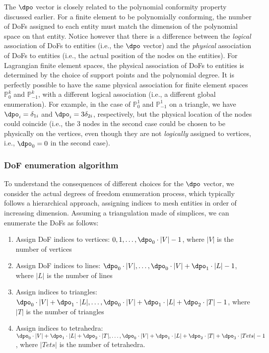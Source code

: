 \begin{remark}
  The $\dpo$ vector is closely related to the polynomial conformity property discussed earlier. For a finite element to be polynomially conforming, the number of DoFs assigned to each entity must match the dimension of the polynomial space on that entity. Notice however that there is a difference between the \emph{logical} association of DoFs to entities (i.e., the $\dpo$ vector) and the \emph{physical} association of DoFs to entities (i.e., the actual position of the nodes on the entities). For Lagrangian finite element spaces, the physical association of DoFs to entities is determined by the choice of support points and the polynomial degree. It is perfectly possible to have the same physical association for finite element spaces $\mathbb{P}^k_{0}$ and $\mathbb{P}^k_{-1}$, with a different logical association (i.e., a different global enumeration). For example, in the case of $\mathbb{P}^1_{0}$ and $\mathbb{P}^1_{-1}$ on a triangle, we have $\dpo_i = \delta_{1i}$ and $\dpo_i = 3\delta_{2i}$, respectively, but the physical location of the nodes could coincide (i.e., the $3$ nodes in the second case could be chosen to be physically on the vertices, even though they are not \emph{logically} assigned to vertices, i.e., $\dpo_0 = 0$ in the second case).
\end{remark}

\subsubsection{DoF enumeration algorithm}

To understand the consequences of different choices for the $\dpo$ vector, we consider the actual degrees of freedom enumeration process, which typically follows a hierarchical approach, assigning indices to mesh entities in order of increasing dimension. Assuming a triangulation made of simplices, we can enumerate the DoFs as follows:

\begin{enumerate}
  \item Assign DoF indices to vertices: $0, 1, \ldots, \dpo_0 \cdot |V| - 1$, where $|V|$ is the number of vertices
  \item Assign DoF indices to lines: $\dpo_0 \cdot |V|, \ldots, \dpo_0 \cdot |V| + \dpo_1 \cdot |L| - 1$, where $|L|$ is the number of lines
  \item Assign indices to triangles: $\dpo_0 \cdot |V| + \dpo_1 \cdot |L|, \ldots, \dpo_0 \cdot |V| + \dpo_1 \cdot |L| + \dpo_2 \cdot |T| - 1$, where $|T|$ is the number of triangles
  \item Assign indices to tetrahedra: $\dpo_0 \cdot |V| + \dpo_1 \cdot |L| + \dpo_2 \cdot |T|, \ldots, \dpo_0 \cdot |V| + \dpo_1 \cdot |L| + \dpo_2 \cdot |T| + \dpo_3 \cdot |Tets| - 1$, where $|Tets|$ is the number of tetrahedra.
\end{enumerate}

